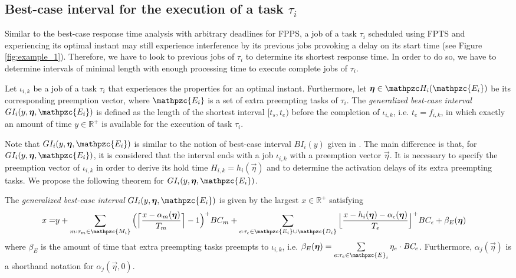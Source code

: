 \subsection{Best-case interval for the execution of a task $\tau_i$}

Similar to the best-case response time analysis with arbitrary deadlines for FPPS, a job of a task $\tau_i$ scheduled using FPTS and experiencing its optimal instant may still experience interference by its previous jobs provoking a delay on its start time (see Figure \ref{fig:example_1}). Therefore, we have to look to previous jobs of $\tau_i$ to determine its shortest response time. In order to do so,  we have to determine intervals of minimal length with enough processing time to execute complete jobs of $\tau_i$.

\begin{definition}\label{def:gen_best_interval}
	Let $\iota_{i,k}$ be a job of a task $\tau_i$ that experiences the properties for an optimal instant. Furthermore, let $\vec{\eta} \in \hlt_i(\mathpzc{E_i})$ be its corresponding preemption vector, where $\mathpzc{E_i}$ is a set of extra preempting tasks of $\tau_i$. The \textit{generalized best-case interval} $GI_i(y, \vec{\eta}, \mathpzc{E_i})$ is defined as the length of the shortest interval $[t_s,t_e)$ before the completion of $\iota_{i,k}$, i.e. $t_e = f_{i,k}$, in which exactly an amount of time $y \in \mathbb{R}^+$ is available for the execution of task $\tau_i$.
\end{definition}

Note that $GI_i(y, \vec{\eta},  \mathpzc{E_i})$ is similar to the notion of {best-case interval} $BI_i(y)$ given in \cite{BLM13}. The main difference is that, for $GI_i(y, \vec{\eta},  \mathpzc{E_i})$, it is considered that the interval ends with a job $\iota_{i,k}$ with a preemption vector $\vec{\eta}$. It is necessary to specify the preemption vector of $\iota_{i,k}$ in order to derive its hold time $H_{i,k}=h_i(\vec{\eta})$ and to determine the activation delays of its extra preempting tasks. We propose the following theorem for $GI_i(y, \vec{\eta},  \mathpzc{E_i})$.

\begin{theorem}
	The \textit{generalized best-case interval} $GI_i(y, \vec{\eta},  \mathpzc{E_i})$ is given by the largest $x \in \mathbb{R}^+$ satisfying
	\begin{align} \label{eq:g_best_interval}
	\begin{split}
	x = &y + \sum\limits_{m:\tau_m \in \mathpzc{M_i}} \Big( \Big\lceil  \dfrac{x-\alpha_m(\vec{\eta})}{T_m}\Big\rceil -1 \Big)^+  BC_m + \sum\limits_{\epsilon:\tau_{\epsilon} \in \mathpzc{E_i} \cup \mathpzc{D_i}} \Big\lfloor  \dfrac{x-h_i(\vec{\eta})-\alpha_\epsilon(\vec{\eta})}{T_\epsilon}\Big\rfloor^+  BC_\epsilon+ \beta_E(\vec{\eta})
	\end{split} 
		\end{align}
	where $\beta_E$ is the amount of time that extra preempting tasks preempts to $\iota_{i,k}$, i.e. $\beta_E(\vec{\eta}) = \sum\limits_{e:\tau_e \in \mathpzc{E}_i} \eta_e \cdot \bc_e$. Furthermore, $\alpha_j(\vec{\eta})$ is a shorthand notation for $\alpha_j(\vec{\eta},0)$.
\end{theorem}

